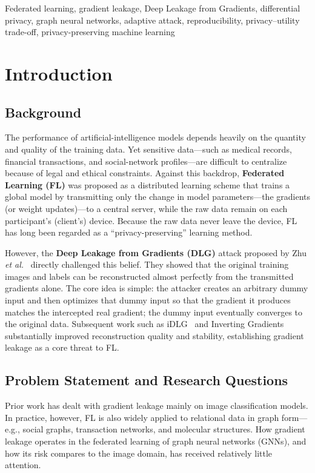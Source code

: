 \documentclass[conference]{IEEEtran}
\begin{document}
\begin{IEEEkeywords}
Federated learning, gradient leakage, Deep Leakage from Gradients, differential
privacy, graph neural networks, adaptive attack, reproducibility,
privacy--utility trade-off, privacy-preserving machine learning
\end{IEEEkeywords}

\section{Introduction}

\subsection{Background}
The performance of artificial-intelligence models depends heavily on the
quantity and quality of the training data. Yet sensitive data---such as medical
records, financial transactions, and social-network profiles---are difficult to
centralize because of legal and ethical constraints. Against this backdrop,
\textbf{Federated Learning (FL)} was proposed as a distributed learning scheme
that trains a global model by transmitting only the change in model
parameters---the gradients (or weight updates)---to a central server, while the
raw data remain on each participant's (client's) device. Because the raw data
never leave the device, FL has long been regarded as a ``privacy-preserving''
learning method.

However, the \textbf{Deep Leakage from Gradients (DLG)} attack proposed by
Zhu \textit{et al.}~\cite{zhu2019dlg} directly challenged this belief. They
showed that the original training images and labels can be reconstructed almost
perfectly from the transmitted gradients alone. The core idea is simple: the
attacker creates an arbitrary dummy input and then optimizes that dummy input so
that the gradient it produces matches the intercepted real gradient; the dummy
input eventually converges to the original data. Subsequent work such as
iDLG~\cite{zhao2020idlg} and Inverting
Gradients~\cite{geiping2020inverting} substantially improved reconstruction
quality and stability, establishing gradient leakage as a core threat to FL.

\subsection{Problem Statement and Research Questions}
Prior work has dealt with gradient leakage mainly on image classification
models. In practice, however, FL is also widely applied to relational data in
graph form---e.g., social graphs, transaction networks, and molecular
structures. How gradient leakage operates in the federated learning of graph
neural networks (GNNs), and how its risk compares to the image domain, has
received relatively little attention.
\end{document}
